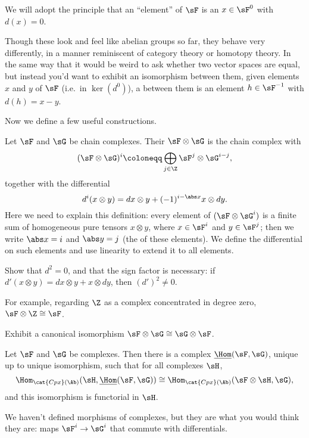 We will adopt the principle that an ``element'' of $\sF$ is an $x\in\sF^0$ with $d(x) = 0$.
\begin{rem}
Though these look and feel like abelian groups so far, they behave very differently, in a manner reminiscent of category theory or homotopy theory. In the same way that it would be weird to ask whether two vector spaces are equal, but instead you'd want to exhibit an isomorphism between them, given elements $x$ and $y$ of $\sF$ (i.e.\ in $\ker(d^0)$), a  between them is an element $h\in\sF^{-1}$ with $d(h) = x-y$.
\end{rem}
Now we define a few useful constructions.
\begin{defn}
Let $\sF$ and $\sG$ be chain complexes. Their  $\sF\otimes\sG$ is the chain complex with
\begin{equation}
	(\sF\otimes\sG)^i\coloneqq \bigoplus_{j\in\Z} \sF^j\otimes \sG^{i-j},
\end{equation}
together with the differential
\begin{equation}
	d^i(x\otimes y) = dx\otimes y + (-1)^{i-\abs x}x\otimes dy.
\end{equation}
Here we need to explain this definition: every element of $(\sF\otimes\sG^i)$ is a finite sum of homogeneous pure tensors $x\otimes y$, where $x\in\sF^i$ and $y\in\sF^j$; then we write $\abs x = i$ and $\abs y = j$ (the  of these elements). We define the differential on such elements and use linearity to extend it to all elements.
\end{defn}
\begin{ex}
Show that $d^2 = 0$, and that the sign factor is necessary: if $d'(x\otimes y) = dx\otimes y + x\otimes dy$, then $(d')^2\ne 0$.
\end{ex}
For example, regarding $\Z$ as a complex concentrated in degree zero, $\sF\otimes\Z\cong \sF$.
\begin{ex}
Exhibit a canonical isomorphism $\sF\otimes\sG\cong\sG\otimes\sF$.
\end{ex}
\begin{lem}
Let $\sF$ and $\sG$ be complexes. Then there is a complex $\underline{\Hom}(\sF,\sG)$, unique up to unique isomorphism, such that for all complexes $\sH$,
\begin{equation}
    \Hom_{\cat{Cpx}(\Ab)}(\sH, \underline{\Hom}(\sF,\sG))\cong\Hom_{\cat{Cpx}(\Ab)}(\sF\otimes\sH, \sG),
\end{equation}
and this isomorphism is functorial in $\sH$.
\end{lem}
We haven't defined morphisms of complexes, but they are what you would think they are: maps $\sF^i\to\sG^i$ that commute with differentials.

